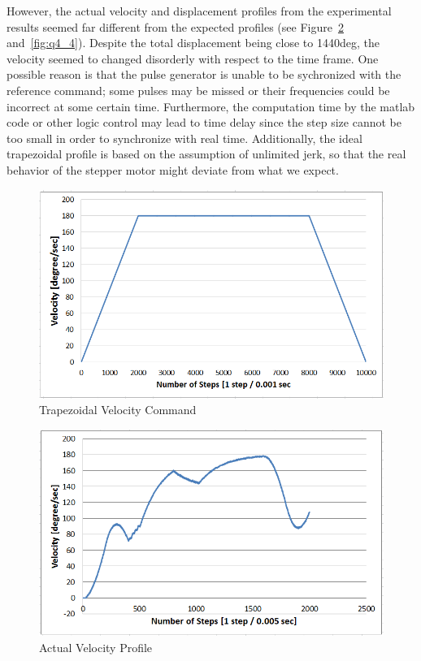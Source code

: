 \documentclass{article}
\theoremstyle{plain}
\theoremstyle{definition}
\theoremstyle{remark}
\begin{document}
However, the actual velocity and displacement profiles from the experimental results seemed far different from the expected profiles (see Figure~\ref{fig:q4_3} and~\ref{fig:q4_4}). Despite the total displacement being close to 1440deg, the velocity seemed to changed disorderly with respect to the time frame. One possible reason is that the pulse generator is unable to be sychronized with the reference command; some pulses may be missed or their frequencies could be incorrect at some certain time. Furthermore, the computation time by the matlab code or other logic control may lead to time delay since the step size cannot be too small in order to synchronize with real time. Additionally, the ideal trapezoidal profile is based on the assumption of unlimited jerk, so that the real behavior of the stepper motor might deviate from what we expect.

\begin{figure}[h!]
\includegraphics[width=1\textwidth]{Q4_CommandGeneration.png}
\caption{Trapezoidal Velocity Command} \label{tex}
\label{fig:q4_2}
\end{figure}

\begin{figure}[b!]
\includegraphics[width=1\textwidth]{Q4_Trapezoid_Velocity_Fail.png}
\caption{Actual Velocity Profile} \label{tex}
\label{fig:q4_3}
\end{figure}
  
\end{document}
